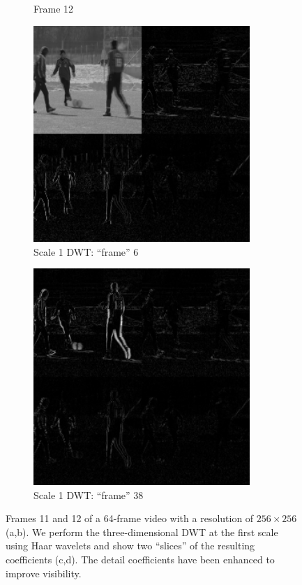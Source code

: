 \begin{figure}
\begin{subfigure}{0.35\textwidth}
    \caption{Frame 12}
  \end{subfigure}
  \begin{subfigure}{0.35\textwidth}
    \includegraphics[width=0.9\textwidth]{Chapter3/Images/dwt_6.png}
    \caption{Scale 1 DWT: ``frame'' 6}
  \end{subfigure}
  \begin{subfigure}{0.35\textwidth}
    \includegraphics[width=0.9\textwidth]{Chapter3/Images/dwt_38.png}
    \caption{Scale 1 DWT: ``frame'' 38}
  \end{subfigure}
  \caption[Example showing the Haar wavelet decomposition of a video signal]{Frames 11 and 12 of a 64-frame video with a resolution of $256\times 256$ (a,b).
    We perform the three-dimensional DWT at the first scale using Haar wavelets and show two ``slices'' of the resulting coefficients (c,d). The detail coefficients have been enhanced to improve visibility.}
 \label{fig:3d_dwt}
\end{figure}

